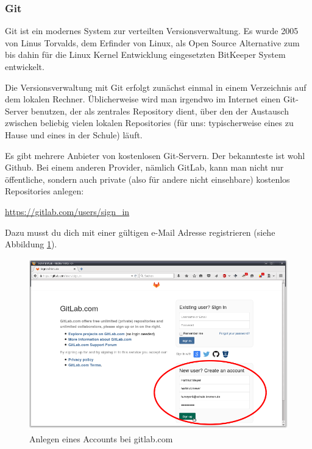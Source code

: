 \subsubsection{Git}

Git ist ein modernes System zur verteilten Versionsverwaltung. Es wurde 2005 von
Linus Torvalds, dem Erfinder von Linux, als Open Source Alternative zum bis
dahin für die Linux Kernel Entwicklung eingesetzten BitKeeper System entwickelt.

Die Versionsverwaltung mit Git erfolgt zunächst einmal in einem Verzeichnis auf
dem lokalen Rechner. Üblicherweise wird man irgendwo im Internet einen
Git-Server benutzen, der als zentrales Repository dient, über den der Austausch
zwischen beliebig vielen lokalen Repositories (für uns: typischerweise eines zu
Hause und eines in der Schule) läuft.

Es gibt mehrere Anbieter von kostenlosen Git-Servern. Der bekannteste ist
wohl Github. Bei einem anderen Provider, nämlich GitLab, kann man nicht nur
öffentliche, sondern auch private (also für andere nicht einsehbare) kostenlos Repositories
anlegen:

\url{https://gitlab.com/users/sign_in}

Dazu musst du dich mit einer gültigen e-Mail Adresse registrieren (siehe
Abbildung \ref{fig:gitlab-account-creation}).

\begin{figure}[h]
  \centering
   \includegraphics[width=1.0\textwidth]{./inf/SEKII/01_Vorbereitung/GitLab_Account_Creation.png}
   \caption{Anlegen eines Accounts bei gitlab.com}
   \label{fig:gitlab-account-creation}
\end{figure}


